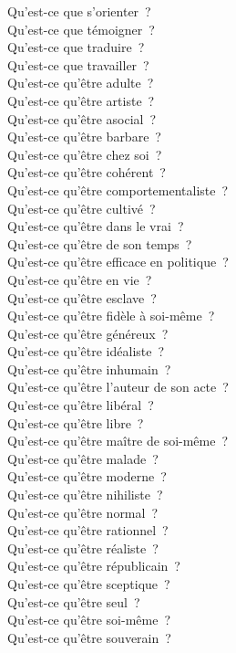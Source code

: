 \documentclass[a4paper,12pt]{article}
\begin{document}
Qu'est-ce que s'orienter ? \\
Qu'est-ce que témoigner ? \\
Qu'est-ce que traduire ? \\
Qu'est-ce que travailler ? \\
Qu'est-ce qu'être adulte ? \\
Qu'est-ce qu'être artiste ? \\
Qu'est-ce qu'être asocial ? \\
Qu'est-ce qu'être barbare ? \\
Qu'est-ce qu'être chez soi ? \\
Qu'est-ce qu'être cohérent ? \\
Qu'est-ce qu'être comportementaliste ? \\
Qu'est-ce qu'être cultivé ? \\
Qu'est-ce qu'être dans le vrai ? \\
Qu'est-ce qu'être de son temps ? \\
Qu'est-ce qu'être efficace en politique ? \\
Qu'est-ce qu'être en vie ? \\
Qu'est-ce qu'être esclave ? \\
Qu'est-ce qu'être fidèle à soi-même ? \\
Qu'est-ce qu'être généreux ? \\
Qu'est-ce qu'être idéaliste ? \\
Qu'est-ce qu'être inhumain ? \\
Qu'est-ce qu'être l'auteur de son acte ? \\
Qu'est-ce qu'être libéral ? \\
Qu'est-ce qu'être libre ? \\
Qu'est-ce qu'être maître de soi-même ? \\
Qu'est-ce qu'être malade ? \\
Qu'est-ce qu'être moderne ? \\
Qu'est-ce qu'être nihiliste ? \\
Qu'est-ce qu'être normal ? \\
Qu'est-ce qu'être rationnel ? \\
Qu'est-ce qu'être réaliste ? \\
Qu'est-ce qu'être républicain ? \\
Qu'est-ce qu'être sceptique ? \\
Qu'est-ce qu'être seul ? \\
Qu'est-ce qu'être soi-même ? \\
Qu'est-ce qu'être souverain ? \\
\end{document}
